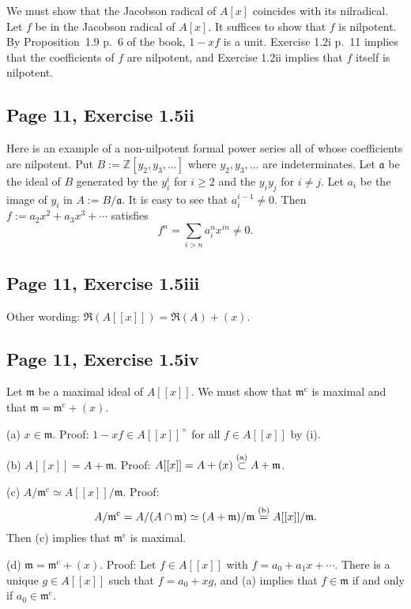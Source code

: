 \documentclass[parskip=half,fontsize=12pt]{scrartcl}%
\newcommand{\oo}{\operatorname}\newcommand{\ooo}{\operatorname*}
\newcommand{\mf}{\mathfrak}
\newcommand{\aaa}{\mf a}
\newcommand{\mmm}{\mf m}
\begin{document}
We must show that the Jacobson radical of $A[x]$ coincides with its nilradical. Let $f$ be in the Jacobson radical of $A[x]$. It suffices to show that $f$ is nilpotent. By Proposition~1.9 p.~6 of the book, $1-xf$ is a unit. Exercise 1.2i p.~11 implies that the coefficients of $f$ are nilpotent, and Exercise 1.2ii implies that $f$ itself is nilpotent.

\subsection{Page 11, Exercise 1.5ii}%

Here is an example of a non-nilpotent formal power series all of whose coefficients are nilpotent. Put $B:=\mathbb Z[y_2,y_3,\dots]$ where $y_2,y_3,\dots$ are indeterminates. Let $\aaa$ be the ideal of $B$ generated by the $y_i^i$ for $i\ge2$ and the $y_iy_j$ for $i\neq j$. Let $a_i$ be the image of $y_i$ in $A:=B/\aaa$. It is easy to see that $a_i^{i-1}\neq0$. Then $f:=a_2x^2+a_3x^3+\cdots$ satisfies 
$$
f^n=\sum_{i>n}a_i^nx^{in}\neq0.
$$

\subsection{Page 11, Exercise 1.5iii}%

Other wording: $\mf R(A[[x]])=\mf R(A)+(x)$.

\subsection{Page 11, Exercise 1.5iv}

Let $\mf m$ be a maximal ideal of $A[[x]]$. We must show that $\mf m^{\oo c}$ is maximal and that $\mf m=\mf m^{\oo c}+(x)$.

(a) $x\in\mf m$. Proof: $1-xf\in A[[x]]^\times$ for all $f\in A[[x]]$ by (i).

(b) $A[[x]]=A+\mf m$. Proof: $A[[x]]=A+(x)\overset{(\text a)}\subset A+\mf m$.

(c) $A/\mf m^{\oo c}\simeq A[[x]]/\mf m$. Proof: 
$$
A/\mf m^{\oo c}=A/(A\cap\mf m)\simeq(A+\mf m)/\mf m\overset{(\text b)}=A[[x]]/\mf m.
$$ 
Then (c) implies that $\mf m^{\oo c}$ is maximal.

(d) $\mf m=\mf m^{\oo c}+(x)$. Proof: Let $f\in A[[x]]$ with $f=a_0+a_1x+\cdots$. There is a unique $g\in A[[x]]$ such that $f=a_0+xg$, and (a) implies that $f\in\mmm$ if and only if $a_0\in\mf m^{\oo c}$. %
\end{document}
